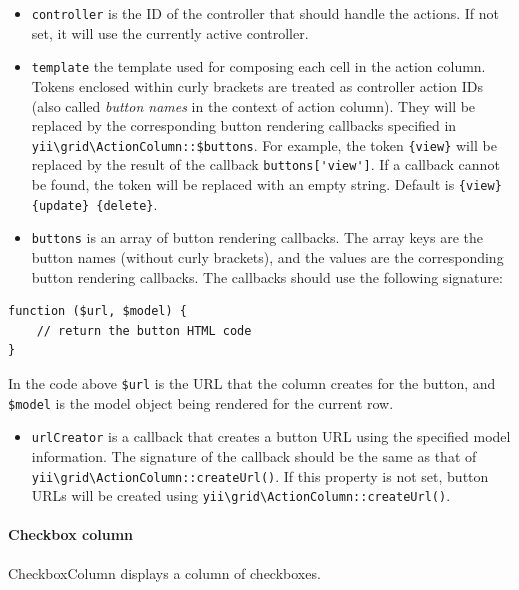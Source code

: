 \begin{itemize}
\item \lstinline|controller| is the ID of the controller that should handle the actions. If not set, it will use the currently active
controller.
\item \lstinline|template| the template used for composing each cell in the action column. Tokens enclosed within curly brackets are
treated as controller action IDs (also called \textit{button names} in the context of action column). They will be replaced
by the corresponding button rendering callbacks specified in \texttt{yii{\allowbreak{}\textbackslash}grid{\allowbreak{}\textbackslash}ActionColumn\allowbreak{}::\allowbreak{}\$buttons}. For example, the token \lstinline|{view}| will be
replaced by the result of the callback \lstinline|buttons['view']|. If a callback cannot be found, the token will be replaced
with an empty string. Default is \lstinline|{view} {update} {delete}|.
\item \lstinline|buttons| is an array of button rendering callbacks. The array keys are the button names (without curly brackets),
and the values are the corresponding button rendering callbacks. The callbacks should use the following signature:
\end{itemize}
\lstset{language=php}\begin{lstlisting}
function ($url, $model) {
    // return the button HTML code
}
\end{lstlisting}
In the code above \lstinline|$url| is the URL that the column creates for the button, and \lstinline|$model| is the model object being
rendered for the current row.

\begin{itemize}
\item \lstinline|urlCreator| is a callback that creates a button URL using the specified model information. The signature of
the callback should be the same as that of \texttt{yii{\allowbreak{}\textbackslash}grid{\allowbreak{}\textbackslash}ActionColumn\allowbreak{}::\allowbreak{}createUrl()}. If this property is not set,
button URLs will be created using \texttt{yii{\allowbreak{}\textbackslash}grid{\allowbreak{}\textbackslash}ActionColumn\allowbreak{}::\allowbreak{}createUrl()}.
\end{itemize}
\paragraph{Checkbox column}
CheckboxColumn displays a column of checkboxes.

